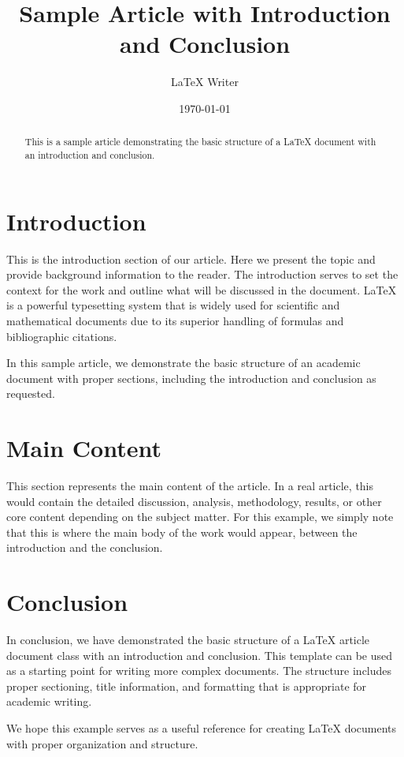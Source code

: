 \documentclass{article}
\title{Sample Article with Introduction and Conclusion}
\author{LaTeX Writer}
\date{\today}
\begin{document}
\maketitle

\begin{abstract}
This is a sample article demonstrating the basic structure of a LaTeX document with an introduction and conclusion.
\end{abstract}

\section{Introduction}
This is the introduction section of our article. Here we present the topic and provide background information to the reader. The introduction serves to set the context for the work and outline what will be discussed in the document. LaTeX is a powerful typesetting system that is widely used for scientific and mathematical documents due to its superior handling of formulas and bibliographic citations.

In this sample article, we demonstrate the basic structure of an academic document with proper sections, including the introduction and conclusion as requested.

\section{Main Content}
This section represents the main content of the article. In a real article, this would contain the detailed discussion, analysis, methodology, results, or other core content depending on the subject matter. For this example, we simply note that this is where the main body of the work would appear, between the introduction and the conclusion.

\section{Conclusion}
In conclusion, we have demonstrated the basic structure of a LaTeX article document class with an introduction and conclusion. This template can be used as a starting point for writing more complex documents. The structure includes proper sectioning, title information, and formatting that is appropriate for academic writing.

We hope this example serves as a useful reference for creating LaTeX documents with proper organization and structure.
\end{document}
